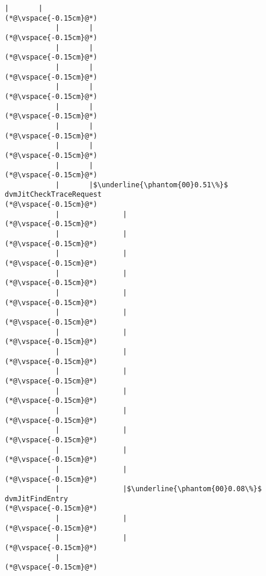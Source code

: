 \begin{lstlisting}[caption=Staattinen metodi Java$\to$C , label=profile:J2CBenchmark00001, numberbychapter=true, frame=lines, float, floatplacement=t]
            |       |
(*@\vspace{-0.15cm}@*)
            |       |
(*@\vspace{-0.15cm}@*)
            |       |
(*@\vspace{-0.15cm}@*)
            |       |
(*@\vspace{-0.15cm}@*)
            |       |
(*@\vspace{-0.15cm}@*)
            |       |
(*@\vspace{-0.15cm}@*)
            |       |
(*@\vspace{-0.15cm}@*)
            |       |
(*@\vspace{-0.15cm}@*)
            |       |
(*@\vspace{-0.15cm}@*)
            |       |$\underline{\phantom{00}0.51\%}$ dvmJitCheckTraceRequest
(*@\vspace{-0.15cm}@*)
            |               |
(*@\vspace{-0.15cm}@*)
            |               |
(*@\vspace{-0.15cm}@*)
            |               |
(*@\vspace{-0.15cm}@*)
            |               |
(*@\vspace{-0.15cm}@*)
            |               |
(*@\vspace{-0.15cm}@*)
            |               |
(*@\vspace{-0.15cm}@*)
            |               |
(*@\vspace{-0.15cm}@*)
            |               |
(*@\vspace{-0.15cm}@*)
            |               |
(*@\vspace{-0.15cm}@*)
            |               |
(*@\vspace{-0.15cm}@*)
            |               |
(*@\vspace{-0.15cm}@*)
            |               |
(*@\vspace{-0.15cm}@*)
            |               |
(*@\vspace{-0.15cm}@*)
            |               |
(*@\vspace{-0.15cm}@*)
            |               |$\underline{\phantom{00}0.08\%}$ dvmJitFindEntry
(*@\vspace{-0.15cm}@*)
            |               |
(*@\vspace{-0.15cm}@*)
            |               |
(*@\vspace{-0.15cm}@*)
            |
(*@\vspace{-0.15cm}@*)

\end{lstlisting}
